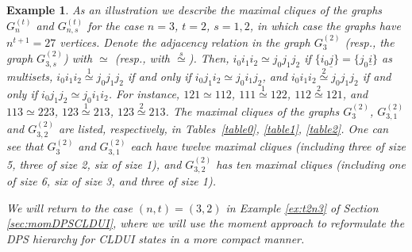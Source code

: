 \documentclass[11pt]{article}
\newcommand{\ui}{\underline{i}}
\newcommand{\uj}{\underline{j}}
\newcommand{\edge}{\stackrel{1}{\simeq}}
\newcommand{\edgetwo}{\stackrel{2}{\simeq}}
\theoremstyle{plain}
\newtheorem{example}[satz]{Example}
\begin{document}
\begin{example}\label{example:CLDUI-cliques} %
As an illustration we describe the maximal cliques of the graphs $G^{(t)}_n$ and $G^{(t)}_{n,s}$ for the case $n=3$, $t=2$, $s=1,2$, in which case the graphs have  $n^{t+1}=27$ vertices. 
Denote the adjacency relation in the graph $G^{(2)}_3$ (resp., the graph $G^{(2)}_{3,s}$) with $\simeq$ (resp., with $\stackrel{s}{\simeq}$).
Then, 
$i_0i_1i_2\simeq j_0j_1j_2$   if  $\{i_0\uj\}=\{j_0\ui\}$ as multisets, 
$i_0i_1i_2 \edge j_0j_1j_2$ 
if and only if  $i_0j_1i_2\simeq j_0i_1j_2$, and $i_0i_1i_2 \edgetwo j_0j_1j_2$ if and only if  
$i_0j_1j_2\simeq j_0i_1i_2$.
For instance, $121\simeq 112$,  $111\edge 122$, $112\edgetwo 121$,  and $113\simeq 223$, $123\edge 213$, $123\edgetwo 213$. The maximal cliques of the graphs $G^{(2)}_3$, $G^{(2)}_{3,1}$ and $G^{(2)}_{3,2}$ are listed, respectively, in Tables~\ref{table0}, \ref{table1}, \ref{table2}. One can see that 
$G^{(2)}_3$ and $G^{(2)}_{3,1}$ each  have twelve maximal cliques (including three of size 5, three of size 2, six of size 1), and $G^{(2)}_{3,2}$ has ten maximal cliques (including one of size 6, six of size 3, and three of size 1).

We will return to the case $(n,t)=(3,2)$   in Example \ref{ex:t2n3} of Section \ref{sec:momDPSCLDUI}, where we will use the moment approach  
to reformulate the DPS hierarchy for CLDUI states
in a more compact manner.
\end{example}
\end{document}
